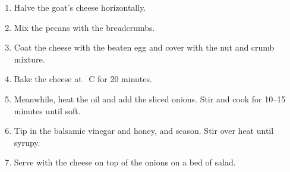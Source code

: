 \documentclass[main.tex]{subfiles}
\begin{document}
\begin{enumerate}	
	\item Halve the goat's cheese horizontally.
	
	\item Mix the pecans with the breadcrumbs.
	
	\item Coat the cheese with the beaten egg and cover with the nut and crumb mixture. 
	
	\item Bake the cheese at \unit[200]{\textdegree C} for 20 minutes.
	
	\item Meanwhile, heat the oil and add the sliced onions. Stir and cook for 10--15 minutes until soft.
	
	\item Tip in the balsamic vinegar and honey, and season. Stir over heat until syrupy.
	
	\item Serve with the cheese on top of the onions on a bed of salad. 
	
\end{enumerate}
\end{document}
